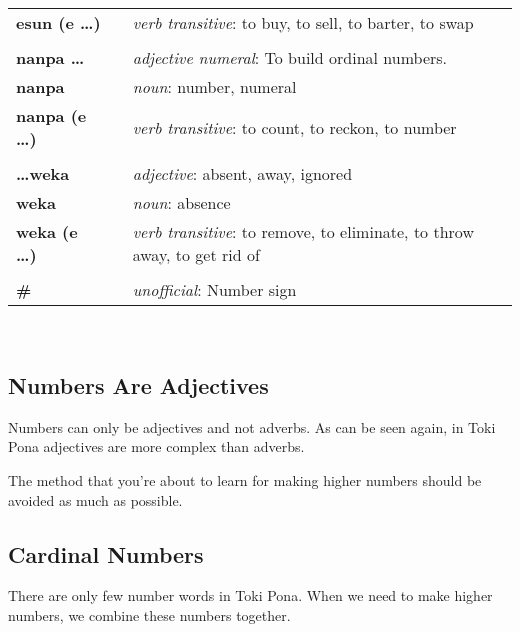 \begin{supertabular}{p{2,5cm}|ll}
\textbf{esun (e \dots)} && \textit{verb transitive}: to buy, to sell, to barter, to swap \\ %
 && \\ %
%
\textbf{nanpa \dots} && \textit{adjective numeral}: To build ordinal numbers. \\ %
\textbf{nanpa} && \textit{noun}: number, numeral \\ %
\textbf{nanpa (e \dots)} && \textit{verb transitive}: to count, to reckon,  to number \\ %
 && \\ %
%
\textbf{\dots weka} && \textit{adjective}: absent, away, ignored \\ %
\textbf{weka} && \textit{noun}: absence \\ %
\textbf{weka (e \dots)} && \textit{verb transitive}: to remove, to eliminate, to throw away, to get rid of \\ %
 && \\ %
%
\index{\#}
\textbf{\#} && \textit{unofficial}: Number sign  \\ %
%
\end{supertabular} \\
%
%
%
\newpage
%
\subsection*{Numbers Are Adjectives}
%
%
Numbers can only be adjectives and not adverbs. 
As can be seen again, in Toki Pona adjectives are more complex than adverbs. 

The method that you're about to learn for making higher numbers should be avoided as much as possible. 
%

\subsection*{Cardinal Numbers}
%
There are only few number words in Toki Pona.
When we need to make higher numbers, we combine these numbers together. 

